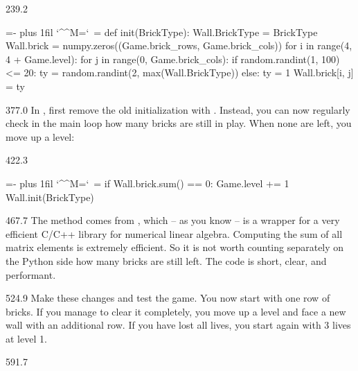 \documentclass{aslab}
\makeatletter
\newcommand*\kw[1]{\textcolor{codeorange}{#1}}
\newcommand*\fn[1]{\textcolor{codecyan}{#1}}
\newcommand*\num[1]{\textcolor{codered}{#1}}
\newenvironment{pycode}{\par\ttfamily\hyphenchar\font=-1
  \lineskiplimit=-\maxdimen\lineskip=0pt\parindent=0pt
  \parfillskip=0pt plus 1fil\relax
  \catcode`\^^M=\active\catcode`\ =\active\py@setup\py@gobble}{}
\makeatother
\begin{document}
\begin{region}[x=74.7,pitch=13.2]{239.2}
\begin{pycode}
\kw{def} \fn{init}(BrickType):
     Wall.BrickType = BrickType
     Wall.brick = numpy.zeros((Game.brick\_rows, Game.brick\_cols))
     \kw{for} i \kw{in} \fn{range}(\num{4}, \num{4} + Game.level):
         \kw{for} j \kw{in} \fn{range}(\num{0}, Game.brick\_cols):
             \kw{if} random.randint(\num{1}, \num{100}) <= \num{20}:
                 ty = random.randint(\num{2}, \fn{max}(Wall.BrickType))
             \kw{else}:
                 ty = \num{1}
             Wall.brick[i, j] = ty
\end{pycode}
\end{region}

\begin{region}[x=74.7,right=0,pitch=13.2]{377.0}
In , first remove the old initialization with
. Instead, you can now regularly check in the main
loop how many bricks are still in play. When none are left, you move up a
level:
\end{region}

\begin{region}[x=74.7,pitch=13.2]{422.3}
\begin{pycode}
\kw{if} Wall.brick.sum() == \num{0}:
    Game.level += \num{1}
    Wall.init(BrickType)
\end{pycode}
\end{region}

\begin{region}[x=74.7,right=0,pitch=13.2]{467.7}
The method  comes from , which -- as you know -- is a
wrapper for a very efficient C/C++ library for numerical linear algebra.
Computing the sum of all matrix elements is extremely efficient. So it is
not worth counting separately on the Python side how many bricks are still
left. The code is short, clear, and performant.
\end{region}

\begin{region}[x=74.7,right=0,pitch=13.2]{524.9}
Make these changes and test the game. You now start with one row of bricks.
If you manage to clear it completely, you move up a level and face a new
wall with an additional row. If you have lost all lives, you start again
with 3 lives at level 1.
\end{region}

\begin{region}{591.7}
\end{region}
\end{document}
